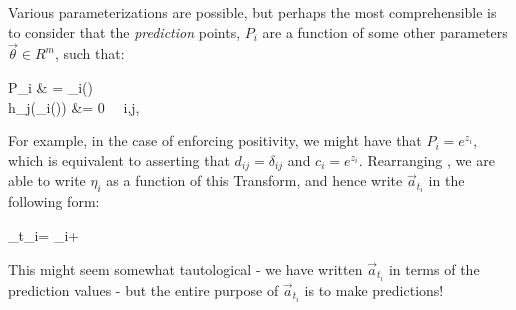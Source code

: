 \documentclass[]{article}
\newcommand\T[1][i]{\mathcal{T}_{#1}}
\def\ai{\vec{a}_{t_i}}
\def\vi{\vec{v}_i}
\def\wi{\vec{w}}
\begin{document}
			Various parameterizations are possible, but perhaps the most comprehensible is to consider that the \textit{prediction} points, $P_i$ are a function of some other parameters $\vec{\theta} \in R^m$, such that:
			\begin{spalign}
				P_i & = \T(\vec{\theta})
				\\
				h_j(\T(\vec{\theta})) &= 0 ~\forall~i,j, \vec{\theta}
			\end{spalign}
			For example, in the case of enforcing positivity, we might have that $P_i = e^{z_i}$, which is equivalent to asserting that $d_{ij} = \delta_{ij}$ and $c_i = e^{z_i}$. Rearranging , we are able to write $\eta_i$ as a function of this Transform, and hence write $\ai$ in the following form:
			\begin{spalign}
				\ai = \vi +  \wi \label{E:Reparam}
			\end{spalign}
			This might seem somewhat tautological - we have written $\ai$ in terms of the prediction values - but the entire purpose of $\ai$ is to make predictions!
\end{document}
